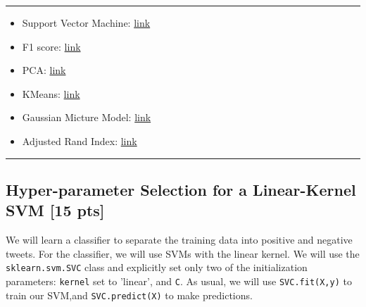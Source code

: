 \documentclass[11pt]{article}
\begin{document}
\vspace{-\baselineskip}
\rule{\textwidth}{1pt}

\begin{itemize}[nolistsep]
\item Support Vector Machine: \href{https://scikit-learn.org/stable/modules/generated/sklearn.svm.SVC.html}{link}
\item F1 score: \href{https://scikit-learn.org/stable/modules/generated/sklearn.metrics.f1_score.html}{link}
\item PCA: \href{https://scikit-learn.org/stable/modules/generated/sklearn.decomposition.PCA.html}{link}
\item KMeans: \href{https://scikit-learn.org/stable/modules/generated/sklearn.cluster.KMeans.html}{link}
\item Gaussian Micture Model: \href{https://scikit-learn.org/stable/modules/generated/sklearn.mixture.GaussianMixture.html}{link}
\item Adjusted Rand Index: \href{https://scikit-learn.org/stable/modules/generated/sklearn.metrics.adjusted_rand_score.html}{link}
\end{itemize}
\vspace{-\baselineskip}
\rule{\textwidth}{1pt}

\subsection{Hyper-parameter Selection for a Linear-Kernel SVM [15 pts]}\label{sec:linear}

We will learn a classifier to separate the training data into positive and negative tweets. For the classifier, we will use SVMs with the linear kernel. We will use the \verb|sklearn.svm.SVC| class and explicitly set only two of the initialization parameters: \verb|kernel| set to 'linear', and \verb|C|. As usual, we will use \verb|SVC.fit(X,y)| to train our SVM,and \verb|SVC.predict(X)| to make predictions.
\end{document}
